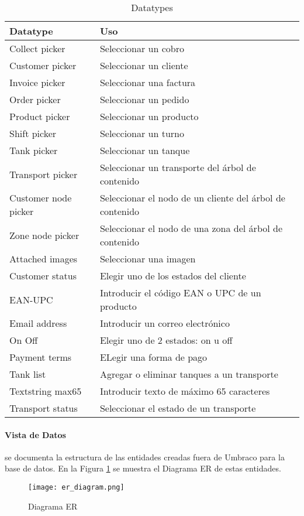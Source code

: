 \begin{longtable}{  l | l  }
    \caption{Datatypes}
    \label{table:datatypes} \\

    \hline\hline
    \rowcolor{gray!30}
    \textbf{Datatype} & \textbf{Uso} \\
    \hline\hline
    \endhead

    \hline
    \endfoot

    \endlastfoot

    Collect picker & Seleccionar un cobro \\
    Customer picker & Seleccionar un cliente \\
    Invoice picker & Seleccionar una factura \\
    Order picker & Seleccionar un pedido \\
    Product picker & Seleccionar un producto \\
    Shift picker & Seleccionar un turno \\
    Tank picker & Seleccionar un tanque \\
    Transport picker & Seleccionar un transporte del árbol de contenido \\
    Customer node picker & Seleccionar el nodo de un cliente del árbol de contenido \\
    Zone node picker & Seleccionar el nodo de una zona del árbol de contenido \\
    Attached images & Seleccionar una imagen \\
    Customer status & Elegir uno de los estados del cliente \\
    EAN-UPC & Introducir el código EAN o UPC de un producto \\
    Email address & Introducir un correo electrónico \\
    On Off & Elegir uno de 2 estados: on u off \\
    Payment terms & ELegir una forma de pago \\
    Tank list & Agregar o eliminar tanques a un transporte \\
    Textstring max65 & Introducir texto de máximo 65 caracteres \\
    Transport status & Seleccionar el estado de un transporte \\

    \hline
\end{longtable}

\paragraph{Vista de Datos} se documenta la estructura de las entidades creadas fuera de Umbraco para la base de datos. En la Figura \ref{fig:er_diagram} se muestra el Diagrama ER de estas entidades.
\begin{figure}[H]
    \centering
    \texttt{[image: er\_diagram.png]}
    \caption{Diagrama ER}
    \label{fig:er_diagram}
\end{figure}